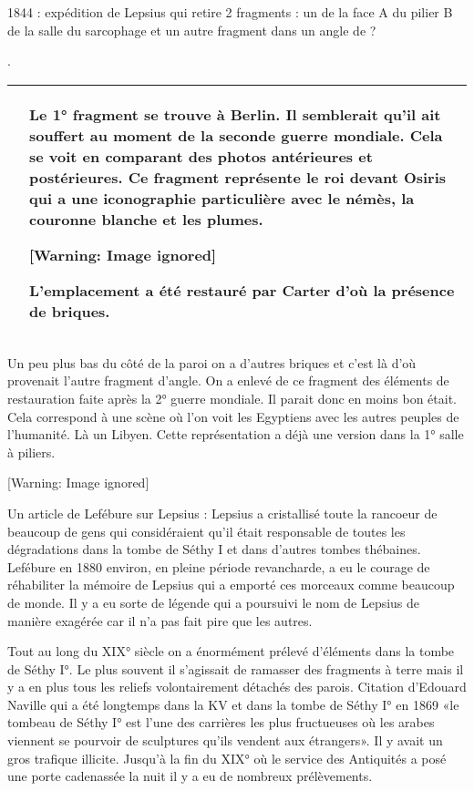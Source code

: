 \documentclass{article}
\begin{document}
 1844 : expédition de Lepsius qui retire 2 fragments : un de la face A
du pilier B de la salle du sarcophage et un autre  fragment dans un
angle de ?

 .

\begin{flushleft}
\tablehead{}
\begin{supertabular}{|m{9.262cm}|m{8.729cm}|}
  &
Le 1° fragment se trouve à Berlin. Il semblerait qu’il ait souffert au
moment de la seconde guerre mondiale. Cela se voit en comparant des
photos antérieures et postérieures. Ce fragment représente le roi
devant Osiris qui a une iconographie particulière avec le némès, la
couronne blanche et les plumes.

  [Warning: Image ignored] %
 

L’emplacement a été restauré par Carter d’où la présence de briques.

\\\hline
\end{supertabular}
\end{flushleft}
Un peu plus bas du côté de la paroi on a d’autres briques et c’est là
d’où provenait l’autre fragment d’angle. On a enlevé de ce fragment des
éléments de restauration faite après la 2° guerre mondiale. Il parait
donc en moins bon était. Cela correspond à une scène où l’on voit les
Egyptiens avec les autres peuples de l’humanité. Là un Libyen. Cette
représentation a déjà une version dans la 1° salle à piliers.

  [Warning: Image ignored] %
 

Un article de Lefébure sur Lepsius : Lepsius a cristallisé toute la
rancoeur de beaucoup de gens qui considéraient qu’il était responsable
de toutes les dégradations dans la tombe de Séthy I et dans d’autres
tombes thébaines. Lefébure en 1880 environ, en pleine période
revancharde,  a eu le courage de réhabiliter la mémoire de Lepsius qui
a emporté ces morceaux comme beaucoup de monde. Il y a eu sorte de
légende qui a poursuivi le nom de Lepsius de manière exagérée car il
n’a pas fait pire que les autres.

Tout au long du XIX° siècle on a énormément prélevé d’éléments dans la
tombe de Séthy I°.  Le plus souvent il s’agissait de ramasser des
fragments à terre mais il y a en plus tous les reliefs volontairement
détachés des parois. Citation d’Edouard Naville qui a été longtemps
dans la KV et dans la tombe de Séthy I° en 1869  «le tombeau de Séthy
I°  est l’une des carrières les plus fructueuses où les arabes viennent
se pourvoir de sculptures qu’ils vendent aux étrangers». Il y avait un
gros trafique illicite. Jusqu’à la fin du XIX° où le service des
Antiquités a posé une porte cadenassée la nuit il y a eu de nombreux
prélèvements. 
\end{document}
